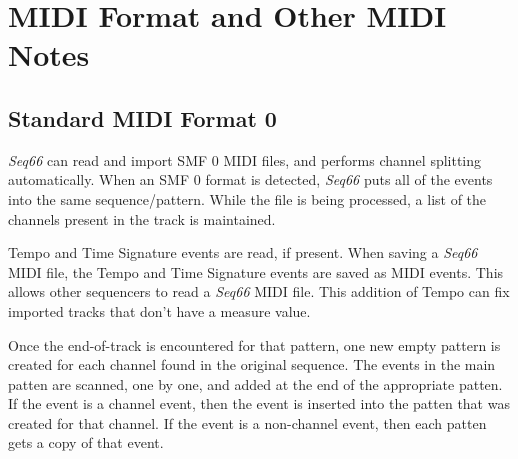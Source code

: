 %
%
%

\section{MIDI Format and Other MIDI Notes}
\label{sec:midi_format_and_midi_notes}

\subsection{Standard MIDI Format 0}
\label{subsec:midi_format_smf_0}

   \textsl{Seq66} can read and import SMF 0 MIDI files, and performs
   channel splitting automatically.
   When an SMF 0 format is detected, \textsl{Seq66}
   puts all of the events into the
   same sequence/pattern.  While the file is being processed, a list of the
   channels present in the track is maintained.

   Tempo and Time Signature events are read, if present.
   When saving a \textsl{Seq66} MIDI file,
   the Tempo and Time Signature events are saved as MIDI events.
   This allows other sequencers to read a \textsl{Seq66} MIDI file.
   This addition of Tempo can fix imported tracks that don't have a
   measure value.

   Once the end-of-track is encountered for that pattern, one new empty
   pattern is created for each channel found in the original sequence.
   The events in the main patten are scanned, one by one, and added at the
   end of the appropriate patten.  If the event is a channel event,
   then the event is inserted into the patten that was created for that
   channel.  If the event is a non-channel event, then each patten gets a
   copy of that event.

